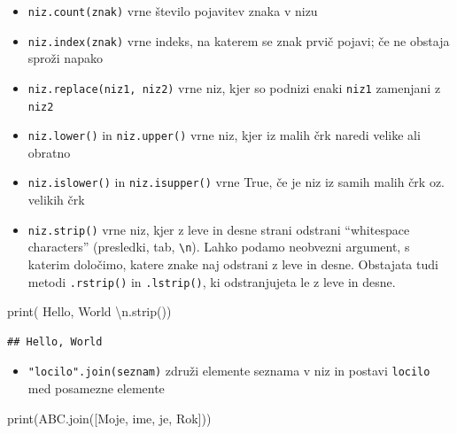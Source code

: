\documentclass[
]{book}
\newenvironment{Shaded}{\begin{snugshade}}{\end{snugshade}}
\newcommand{\BuiltInTok}[1]{#1}
\newcommand{\CharTok}[1]{\textcolor[rgb]{0.31,0.60,0.02}{#1}}
\newcommand{\NormalTok}[1]{#1}
\newcommand{\StringTok}[1]{\textcolor[rgb]{0.31,0.60,0.02}{#1}}
\providecommand{\tightlist}{%
  \setlength{\itemsep}{0pt}\setlength{\parskip}{0pt}}
\begin{document}
\begin{itemize}
\tightlist
\item
  \texttt{niz.count(znak)} vrne število pojavitev znaka v nizu
\item
  \texttt{niz.index(znak)} vrne indeks, na katerem se znak prvič pojavi; če ne obstaja sproži napako
\item
  \texttt{niz.replace(niz1,\ niz2)} vrne niz, kjer so podnizi enaki \texttt{niz1} zamenjani z \texttt{niz2}
\item
  \texttt{niz.lower()} in \texttt{niz.upper()} vrne niz, kjer iz malih črk naredi velike ali obratno
\item
  \texttt{niz.islower()} in \texttt{niz.isupper()} vrne True, če je niz iz samih malih črk oz. velikih črk
\item
  \texttt{niz.strip()} vrne niz, kjer z leve in desne strani odstrani ``whitespace characters'' (presledki, tab, \texttt{\textbackslash{}n}). Lahko podamo neobvezni argument, s katerim določimo, katere znake
  naj odstrani z leve in desne. Obstajata tudi metodi \texttt{.rstrip()} in \texttt{.lstrip()}, ki odstranjujeta le z leve in desne.
\end{itemize}

\begin{Shaded}
\begin{Highlighting}[]
\BuiltInTok{print}\NormalTok{(}\StringTok{\textquotesingle{}    Hello, World    }\CharTok{\textbackslash{}n}\StringTok{\textquotesingle{}}\NormalTok{.strip())}
\end{Highlighting}
\end{Shaded}

\begin{verbatim}
## Hello, World
\end{verbatim}

\begin{itemize}
\tightlist
\item
  \texttt{"locilo".join(seznam)} združi elemente seznama v niz in postavi \texttt{locilo}
  med posamezne elemente
\end{itemize}

\begin{Shaded}
\begin{Highlighting}[]
\BuiltInTok{print}\NormalTok{(}\StringTok{\textquotesingle{}ABC\textquotesingle{}}\NormalTok{.join([}\StringTok{\textquotesingle{}Moje\textquotesingle{}}\NormalTok{, }\StringTok{\textquotesingle{}ime\textquotesingle{}}\NormalTok{, }\StringTok{\textquotesingle{}je\textquotesingle{}}\NormalTok{, }\StringTok{\textquotesingle{}Rok\textquotesingle{}}\NormalTok{]))}
\end{Highlighting}
\end{Shaded}
\end{document}
